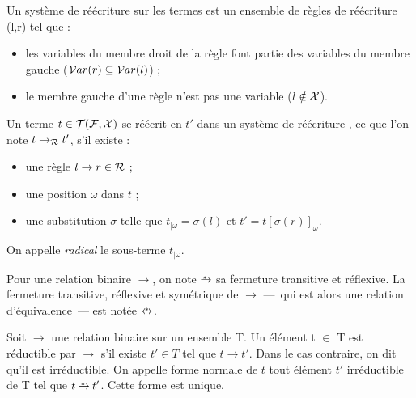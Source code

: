 \begin{definition}
Un système de réécriture sur les termes est un ensemble de règles de réécriture
(l,r) tel que :
\begin{itemize}
  \item les variables du membre droit de la règle font partie  des variables du
  membre gauche ($\mathcal{V} ar(r) \subseteq \mathcal{V} ar(l)$) ;
  \item le membre gauche d'une règle n'est pas une variable ($l \notin \mathcal{X}$).
\end{itemize}
\end{definition}


\begin{definition}[Réécriture]
Un terme $t \in \mathcal{T}(\mathcal{F},\mathcal{X})$ se réécrit en $t'$ dans un système de réécriture \caR, ce
que l'on note $t \rightarrow_{\mathcal{R}} t'$, s'il existe :
\begin{itemize}
  \item une règle $l \rightarrow r \in \mathcal{R}$ ;
  \item une position $\omega$ dans $t$ ;
  \item une substitution $\sigma$ telle que $t_{|\omega} = \sigma(l)$ et $t' =
    t[\sigma(r)]_{\omega}$. %
\end{itemize}
\end{definition}

On appelle \emph{radical} le sous-terme $t_{|\omega}$.

Pour une relation binaire $\rightarrow$, on note $\mathrel{\mbox{$\rightarrow$\hspace{-0.8em}{\footnotesize $^*$}$~$}}$ sa fermeture
transitive et réflexive. La fermeture transitive, réflexive et symétrique de
$\rightarrow$ ---~qui est alors une relation d'équivalence~--- est notée
$\mathrel{\mbox{$\leftrightarrow$\hspace{-0.7em}{\footnotesize $^*$}$~$}}$.


\begin{definition}
Soit $\rightarrow$ une relation binaire sur un ensemble T.
Un élément t $\in$ T est réductible par $\rightarrow$ s'il existe $t' \in T$
tel que $t \rightarrow t'$. Dans le cas contraire, on dit qu'il est
irréductible. On appelle forme normale de $t$ tout élément $t'$ irréductible de
T tel que $t \mathrel{\mbox{$\rightarrow$\hspace{-0.8em}{\footnotesize $^*$}$~$}} t'$. Cette forme est unique.
\end{definition}

